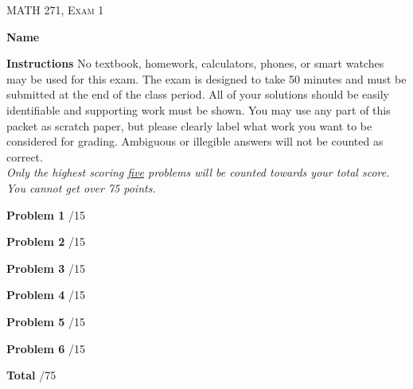 \documentclass[12pt]{amsbook}
\begin{document}

\begin{center}
   \textsc{\large MATH 271, Exam 1}\\
\end{center}
\vspace{1cm}

\noindent\textbf{Name} \; \underline{\hspace{8cm}}

\vspace{1cm}

\noindent\textbf{Instructions} \; No textbook, homework, calculators, phones, or smart watches may be used for this exam. The exam is designed to take 50 minutes and must be submitted at the end of the class period. All of your solutions should be easily identifiable and supporting work must be shown. You may use any part of this packet as scratch paper, but please clearly label what work you want to be considered for grading. Ambiguous or illegible answers will not be counted as correct.\\

\noindent\emph{Only the highest scoring \underline{five} problems will be counted towards your total score. You cannot get over 75 points.}

\vspace{1cm}

\begin{flushleft}
\textbf{Problem 1} \; \underline{\hspace{1cm}}/15

\vspace{.25cm}

\textbf{Problem 2} \; \underline{\hspace{1cm}}/15

\vspace{.25cm}

\textbf{Problem 3} \; \underline{\hspace{1cm}}/15

\vspace{.25cm}

\textbf{Problem 4} \; \underline{\hspace{1cm}}/15

\vspace{.25cm}

\textbf{Problem 5} \; \underline{\hspace{1cm}}/15

\vspace{.25cm}

\textbf{Problem 6} \; \underline{\hspace{1cm}}/15

\vspace{.5cm}

\textbf{Total} \;\hspace{1.1cm} \underline{\hspace{1.25cm}}/75
\end{flushleft}
\end{document}
